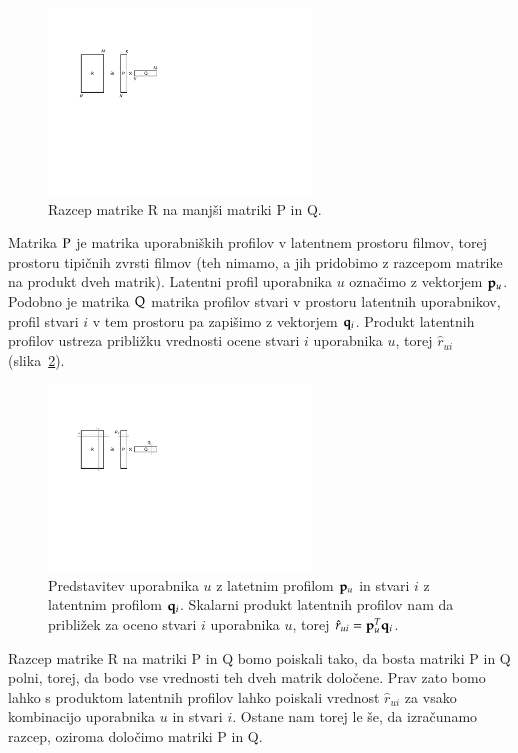 \begin{figure}[htbp]
\begin{center}
\includegraphics[width=7cm]{slike/matricni-razcep.pdf}
\caption{Razcep matrike R na manjši matriki P in Q.}
\label{f:matricni-razcep}
\end{center}
\end{figure}

Matrika $\rm P$ je matrika uporabniških profilov v latentnem prostoru filmov, torej prostoru tipičnih zvrsti filmov (teh nimamo, a jih pridobimo z razcepom matrike na produkt dveh matrik). Latentni profil uporabnika $u$ označimo z vektorjem ${\bf p}_u$. Podobno je matrika $\rm Q$ matrika profilov stvari v prostoru latentnih uporabnikov, profil stvari $i$ v tem prostoru pa zapišimo z vektorjem ${\bf q}_i$. Produkt latentnih profilov ustreza približku vrednosti ocene stvari $i$ uporabnika $u$, torej $\hat{r}_{ui}$ (slika~\ref{f:latentni-faktorji}).

\begin{figure}[htbp]
\begin{center}
\includegraphics[width=7cm]{slike/latentni-faktorji.pdf}
\caption{Predstavitev uporabnika $u$ z latetnim profilom ${\bf p}_u$ in stvari $i$ z latentnim profilom ${\bf q}_i$. Skalarni produkt latentnih profilov nam da približek za oceno stvari $i$ uporabnika $u$, torej $\hat{r}_{ui}={\bf p}_u^T {\bf q}_i$.}
\label{f:latentni-faktorji}
\end{center}
\end{figure}

Razcep matrike R na matriki P in Q bomo poiskali tako, da bosta matriki P in Q polni, torej, da bodo vse vrednosti teh dveh matrik določene. Prav zato bomo lahko s produktom latentnih profilov lahko poiskali vrednost $\hat{r}_{ui}$ za vsako kombinacijo uporabnika $u$ in stvari $i$. Ostane nam torej le še, da izračunamo razcep, oziroma določimo matriki P in Q.

